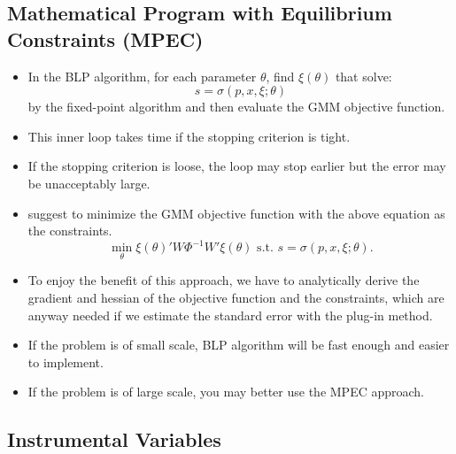 \documentclass[
]{book}
\providecommand{\tightlist}{%
  \setlength{\itemsep}{0pt}\setlength{\parskip}{0pt}}
\begin{document}
\hypertarget{mathematical-program-with-equilibrium-constraints-mpec}{%
\subsection{Mathematical Program with Equilibrium Constraints (MPEC)}\label{mathematical-program-with-equilibrium-constraints-mpec}}

\begin{itemize}
\tightlist
\item
  In the BLP algorithm, for each parameter \(\theta\), find \(\xi(\theta)\) that solve:
  \begin{equation}
  s = \sigma(p, x, \xi; \theta)
  \end{equation}
  by the fixed-point algorithm and then evaluate the GMM objective function.
\item
  This inner loop takes time if the stopping criterion is tight.
\item
  If the stopping criterion is loose, the loop may stop earlier but the error may be unacceptably large.
\item
  \citet{Dube2012} suggest to minimize the GMM objective function with the above equation as the constraints.
  \begin{equation}
  \min_{\theta} \xi(\theta)' W \Phi^{-1} W' \xi(\theta) \text{   s.t.   } s = \sigma(p, x, \xi; \theta).
  \end{equation}
\item
  To enjoy the benefit of this approach, we have to analytically derive the gradient and hessian of the objective function and the constraints, which are anyway needed if we estimate the standard error with the plug-in method.
\item
  If the problem is of small scale, BLP algorithm will be fast enough and easier to implement.
\item
  If the problem is of large scale, you may better use the MPEC approach.
\end{itemize}

\hypertarget{instrumental-variables}{%
\subsection{Instrumental Variables}\label{instrumental-variables}}
\end{document}
